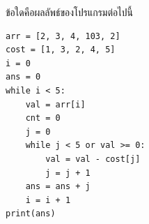\question ข้อใดคือผลลัพธ์ของโปรแกรมต่อไปนี้
\begin{verbatim}
arr = [2, 3, 4, 103, 2]
cost = [1, 3, 2, 4, 5]
i = 0
ans = 0
while i < 5:
    val = arr[i]
    cnt = 0
    j = 0
    while j < 5 or val >= 0:
        val = val - cost[j]
        j = j + 1
    ans = ans + j
    i = i + 1
print(ans)
\end{verbatim}
